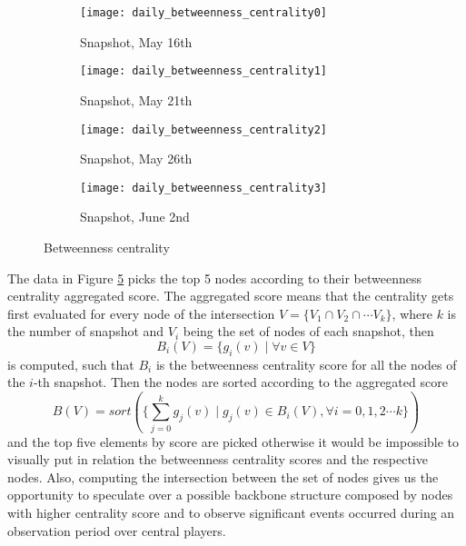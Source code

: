 	\begin{figure}
		\centering
		\begin{subfigure}{0.45\textwidth}
			\centering
			\texttt{[image: daily\_betweenness\_centrality0]}
			\caption{Snapshot, May 16th}
			\label{daily_beetwenness0}
		\end{subfigure}
		\begin{subfigure}{0.45\textwidth}
			\centering
			\texttt{[image: daily\_betweenness\_centrality1]}
			\caption{Snapshot, May 21th}
			\label{daily_betweenness1}
		\end{subfigure}
		\begin{subfigure}{0.45\textwidth}
			\centering
			\texttt{[image: daily\_betweenness\_centrality2]}
			\caption{Snapshot, May 26th}
			\label{daily_betweenness2}
		\end{subfigure}
		\begin{subfigure}{0.45\textwidth}
			\centering
			\texttt{[image: daily\_betweenness\_centrality3]}
			\caption{Snapshot, June 2nd}
			\label{daily_betweenness3}
		\end{subfigure}
		
		\caption{Betweenness centrality}
		\label{daily_betweenness}
	\end{figure}	
	
	The data in Figure \ref{daily_betweenness} picks the top 5 nodes according to their betweenness centrality aggregated score. The aggregated score means that the centrality gets first evaluated for every node of the intersection $V = \{V_1 \cap V_2 \cap \cdots V_k \}$, where $k$ is the number of snapshot and $V_i$ being the set of nodes of each snapshot, then
	\begin{equation}\label{eq:betwenness}
		B_i(V) = \{ g_i(v) \mid \forall v \in V \}
	\end{equation}
	is computed, such that $B_i$ is the betweenness centrality score for all the nodes of the $i$-th snapshot. Then the nodes are sorted according to the aggregated score
	\begin{equation}
		B(V) = sort(\{ \sum_{j = 0}^{k}g_j(v) \mid g_j(v) \in B_i(V), \forall i= 0,1,2 \cdots k\})
	\end{equation}
	and the top five elements by score are picked otherwise it would be impossible to visually put in relation the betweenness centrality scores and the respective nodes. Also, computing the intersection between the set of nodes gives us the opportunity to speculate over a possible backbone structure composed by nodes with higher centrality score and to observe significant events occurred during an observation period over central players.
	
